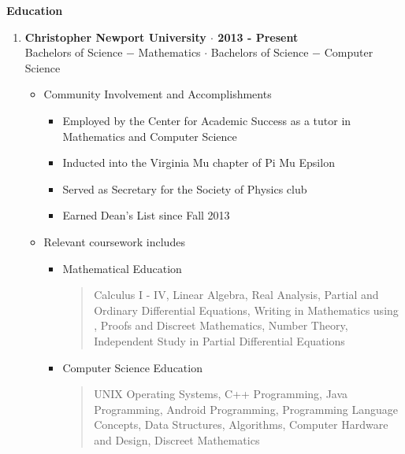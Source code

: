 \noindent\textbf{\large Education}
\begin{enumerate}[label={\Roman*}.]
\item \textbf{Christopher Newport University $\cdot$ 2013 - Present}\\
Bachelors of Science $-$ Mathematics $\cdot$ Bachelors of Science $-$ Computer Science
\begin{itemize}
\item Community Involvement and Accomplishments
\begin{itemize}
\item Employed by the Center for Academic Success as a tutor in Mathematics and Computer Science
\item Inducted into the Virginia Mu chapter of Pi Mu Epsilon
\item Served as Secretary for the Society of Physics club
\item Earned Dean's List since Fall 2013
\end{itemize}
\item Relevant coursework includes
\begin{itemize}
\item Mathematical Education
\begin{quote}
Calculus I - IV, Linear Algebra, Real Analysis, Partial and Ordinary Differential Equations, Writing in
Mathematics using , Proofs and Discreet Mathematics, Number Theory, Independent Study in
Partial Differential Equations
\end{quote}
\item Computer Science Education
\begin{quote}
UNIX Operating Systems, C++ Programming, Java Programming, Android Programming, Programming Language
Concepts, Data Structures, Algorithms, Computer Hardware and Design, Discreet Mathematics
\end{quote}
\end{itemize}
\end{itemize}
\end{enumerate}
